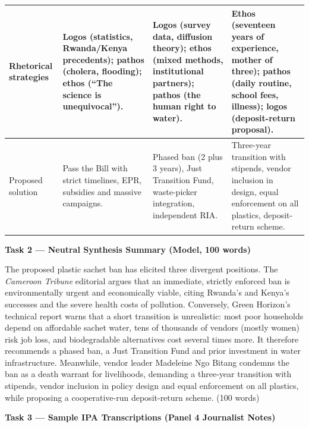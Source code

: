 \documentclass[11pt]{article}
\begin{document}
\begin{center}
\begin{tabularx}{\linewidth}{|l|X|X|X|}
Rhetorical strategies & Logos (statistics, Rwanda/Kenya precedents); pathos (cholera, flooding); ethos (``The science is unequivocal''). & Logos (survey data, diffusion theory); ethos (mixed methods, institutional partners); pathos (the human right to water). & Ethos (seventeen years of experience, mother of three); pathos (daily routine, school fees, illness); logos (deposit-return proposal). \\ \hline
Proposed solution & Pass the Bill with strict timelines, EPR, subsidies and massive campaigns. & Phased ban (2 plus 3 years), Just Transition Fund, waste-picker integration, independent RIA. & Three-year transition with stipends, vendor inclusion in design, equal enforcement on all plastics, deposit-return scheme. \\ \hline
\end{tabularx}
\end{center}

\textbf{Task 2 --- Neutral Synthesis Summary (Model, 100 words)}

The proposed plastic sachet ban has elicited three divergent positions. The \textit{Cameroon Tribune} editorial argues that an immediate, strictly enforced ban is environmentally urgent and economically viable, citing Rwanda's and Kenya's successes and the severe health costs of pollution. Conversely, Green Horizon's technical report warns that a short transition is unrealistic: most poor households depend on affordable sachet water, tens of thousands of vendors (mostly women) risk job loss, and biodegradable alternatives cost several times more. It therefore recommends a phased ban, a Just Transition Fund and prior investment in water infrastructure. Meanwhile, vendor leader Madeleine Ngo Bitang condemns the ban as a death warrant for livelihoods, demanding a three-year transition with stipends, vendor inclusion in policy design and equal enforcement on all plastics, while proposing a cooperative-run deposit-return scheme. (100 words)

\textbf{Task 3 --- Sample IPA Transcriptions (Panel 4 Journalist Notes)}
\end{document}
